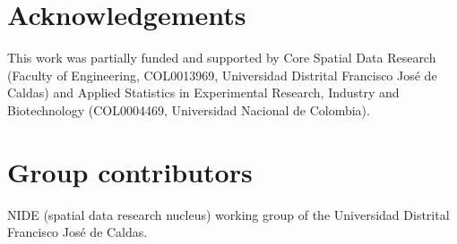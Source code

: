 \documentclass[a4paper,fleqn]{cas-sc}
\numberwithin{equation}{section}
\begin{document}
\section*{Acknowledgements}

This work was partially funded and supported by Core Spatial Data
Research (Faculty of Engineering, COL0013969, Universidad Distrital
Francisco Jos\'e de Caldas) and Applied Statistics in Experimental
Research, Industry and Biotechnology (COL0004469, Universidad Nacional de
Colombia).

\section*{Group contributors}

NIDE (spatial data research nucleus) working group of the Universidad
Distrital Francisco Jos\'e de Caldas.

\end{document}

